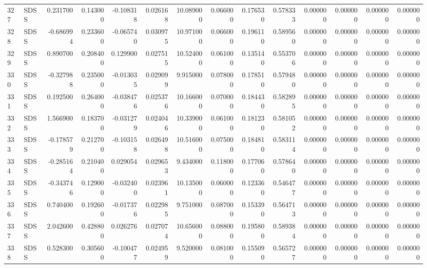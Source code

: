 \begin{tabular}{llrrrrrrrrrrrr}
327 &   SDSS &  0.231700 &      0.143000 & -0.108318 &    0.026168 &  10.089000 &      0.066000 &   0.176530 &  0.578333 &  0.000000 &   0.000000 &     0.000000 &     0.000000 \\
328 &   SDSS & -0.686994 &      0.233600 & -0.065740 &    0.030975 &  10.971000 &      0.066000 &   0.196110 &  0.589560 &  0.000000 &   0.000000 &     0.000000 &     0.000000 \\
329 &   SDSS &  0.890700 &      0.208400 &  0.129900 &    0.027515 &  10.524000 &      0.061000 &   0.135140 &  0.553706 &  0.000000 &   0.000000 &     0.000000 &     0.000000 \\
330 &   SDSS & -0.327988 &      0.235000 & -0.013035 &    0.029099 &   9.915000 &      0.078000 &   0.178510 &  0.579480 &  0.000000 &   0.000000 &     0.000000 &     0.000000 \\
331 &   SDSS &  0.192500 &      0.264000 & -0.038476 &    0.025376 &  10.166000 &      0.070000 &   0.184430 &  0.582895 &  0.000000 &   0.000000 &     0.000000 &     0.000000 \\
332 &   SDSS &  1.566900 &      0.183700 & -0.031279 &    0.024046 &  10.339000 &      0.061000 &   0.181230 &  0.581052 &  0.000000 &   0.000000 &     0.000000 &     0.000000 \\
333 &   SDSS & -0.178579 &      0.212700 & -0.103158 &    0.026498 &  10.516000 &      0.075000 &   0.184810 &  0.583114 &  0.000000 &   0.000000 &     0.000000 &     0.000000 \\
334 &   SDSS & -0.285164 &      0.210400 &  0.029054 &    0.029653 &   9.434000 &      0.118000 &   0.177060 &  0.578640 &  0.000000 &   0.000000 &     0.000000 &     0.000000 \\
335 &   SDSS & -0.343746 &      0.129000 & -0.032400 &    0.023961 &  10.135000 &      0.060000 &   0.123360 &  0.546477 &  0.000000 &   0.000000 &     0.000000 &     0.000000 \\
336 &   SDSS &  0.740400 &      0.192600 & -0.017376 &    0.022985 &   9.751000 &      0.087000 &   0.153390 &  0.564713 &  0.000000 &   0.000000 &     0.000000 &     0.000000 \\
337 &   SDSS &  2.042600 &      0.428800 &  0.026276 &    0.027074 &  10.656000 &      0.088000 &   0.195800 &  0.589384 &  0.000000 &   0.000000 &     0.000000 &     0.000000 \\
338 &   SDSS &  0.528300 &      0.305600 & -0.100477 &    0.024959 &   9.520000 &      0.081000 &   0.155090 &  0.565727 &  0.000000 &   0.000000 &     0.000000 &     0.000000 \\

\end{tabular}
